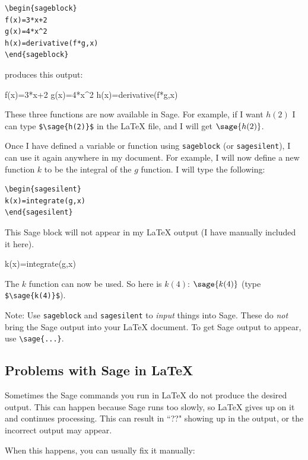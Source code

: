 \documentclass[12pt]{article}
\begin{document}
\begin{verbatim}
\begin{sageblock}
f(x)=3*x+2
g(x)=4*x^2
h(x)=derivative(f*g,x)
\end{sageblock}
\end{verbatim}
produces this output:

\begin{sageblock}
f(x)=3*x+2
g(x)=4*x^2
h(x)=derivative(f*g,x)
\end{sageblock}

These three functions are now available in Sage. For example, if I want $h(2)$ I can type \verb|$\sage{h(2)}$| in the \LaTeX{} file, and I will get $\sage{h(2)}$.

Once I have defined a variable or function using \verb|sageblock| (or \verb|sagesilent|), I can use it again anywhere in my document. For example, I will now define a new function $k$ to be the integral of the $g$ function. I will type the following:

\begin{verbatim}
\begin{sagesilent}
k(x)=integrate(g,x)
\end{sagesilent}
\end{verbatim}

This Sage block will not appear in my \LaTeX{} output (I have manually included it here).

\begin{sagesilent}
k(x)=integrate(g,x)
\end{sagesilent}

The $k$ function can now be used. So here is $k(4)$: $\sage{k(4)}$ (type \verb|$\sage{k(4)}$|).

Note: Use \verb|sageblock| and \verb|sagesilent| to \emph{input} things into Sage. These do \emph{not} bring the Sage output into your \LaTeX{} document. To get Sage output to appear, use \verb|\sage{...}|.

\subsection{Problems with Sage in \LaTeX{}}

Sometimes the Sage commands you run in \LaTeX{} do not produce the desired output. This can happen because Sage runs too slowly, so \LaTeX{} gives up on it and continues processing. This can result in ``??" showing up in the output, or the incorrect output may appear.

When this happens, you can usually fix it manually:
\end{document}

